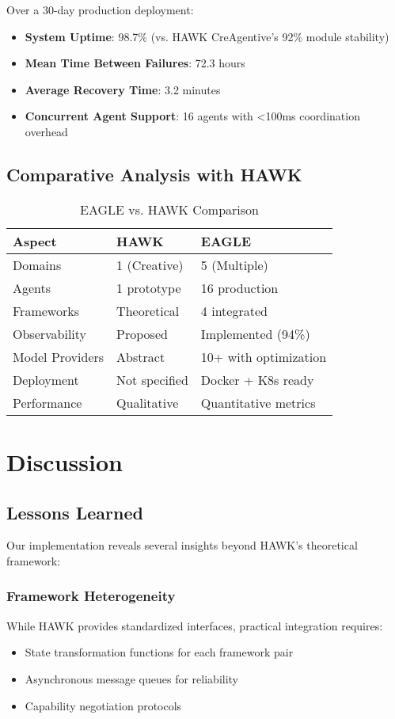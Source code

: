 \documentclass[conference]{IEEEtran}
\begin{document}
Over a 30-day production deployment:

\begin{itemize}
    \item \textbf{System Uptime}: 98.7\% (vs. HAWK CreAgentive's 92\% module stability)
    \item \textbf{Mean Time Between Failures}: 72.3 hours
    \item \textbf{Average Recovery Time}: 3.2 minutes
    \item \textbf{Concurrent Agent Support}: 16 agents with <100ms coordination overhead
\end{itemize}

\subsection{Comparative Analysis with HAWK}

\begin{table}[htbp]
\centering
\caption{EAGLE vs. HAWK Comparison}
\label{tab:comparison}
\begin{tabular}{@{}lll@{}}
\toprule
\textbf{Aspect} & \textbf{HAWK} & \textbf{EAGLE} \\
\midrule
Domains & 1 (Creative) & 5 (Multiple) \\
Agents & 1 prototype & 16 production \\
Frameworks & Theoretical & 4 integrated \\
Observability & Proposed & Implemented (94\%) \\
Model Providers & Abstract & 10+ with optimization \\
Deployment & Not specified & Docker + K8s ready \\
Performance & Qualitative & Quantitative metrics \\
\bottomrule
\end{tabular}
\end{table}

\section{Discussion}

\subsection{Lessons Learned}

Our implementation reveals several insights beyond HAWK's theoretical framework:

\subsubsection{Framework Heterogeneity}
While HAWK provides standardized interfaces, practical integration requires:
\begin{itemize}
    \item State transformation functions for each framework pair
    \item Asynchronous message queues for reliability
    \item Capability negotiation protocols
\end{itemize}
\end{document}
